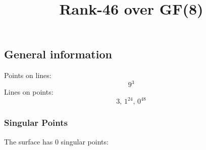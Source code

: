 \documentclass{article}
\newcommand\setTBstruts{\def\T{\rule{0pt}{2.6ex}}%
\def\B{\rule[-1.2ex]{0pt}{0pt}}}
\begin{document}
 
\setTBstruts



{\allowdisplaybreaks%






\title{Rank-46 over GF(8)}
\author{}%
\maketitle%
%
{}



\subsection*{General information}
Points on lines:
$$
9^3$$
Lines on points:
$$
3,\,1^{24},\,0^{48}$$
\subsubsection*{Singular Points}
The surface has 0 singular points:\\
\begin{align*}
\end{align*}
}
\end{document}

